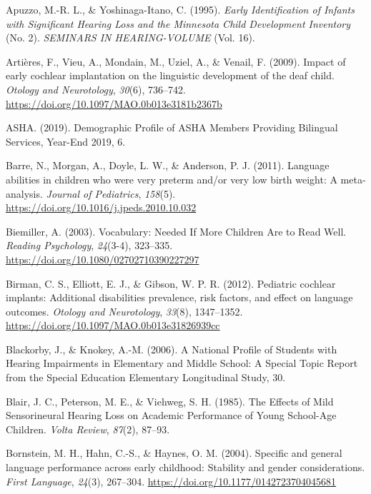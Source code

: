 \documentclass[
  english,
  man]{apa6}
\begin{document}
\leavevmode\hypertarget{ref-apuzzo1995}{}%
Apuzzo, M.-R. L., \& Yoshinaga-Itano, C. (1995). \emph{Early Identification of Infants with Significant Hearing Loss and the Minnesota Child Development Inventory} (No. 2). \emph{SEMINARS IN HEARING-VOLUME} (Vol. 16).

\leavevmode\hypertarget{ref-artieres2009}{}%
Artières, F., Vieu, A., Mondain, M., Uziel, A., \& Venail, F. (2009). Impact of early cochlear implantation on the linguistic development of the deaf child. \emph{Otology and Neurotology}, \emph{30}(6), 736--742. \url{https://doi.org/10.1097/MAO.0b013e3181b2367b}

\leavevmode\hypertarget{ref-asha2019}{}%
ASHA. (2019). Demographic Profile of ASHA Members Providing Bilingual Services, Year-End 2019, 6.

\leavevmode\hypertarget{ref-barre2011}{}%
Barre, N., Morgan, A., Doyle, L. W., \& Anderson, P. J. (2011). Language abilities in children who were very preterm and/or very low birth weight: A meta-analysis. \emph{Journal of Pediatrics}, \emph{158}(5). \url{https://doi.org/10.1016/j.jpeds.2010.10.032}

\leavevmode\hypertarget{ref-biemiller2003}{}%
Biemiller, A. (2003). Vocabulary: Needed If More Children Are to Read Well. \emph{Reading Psychology}, \emph{24}(3-4), 323--335. \url{https://doi.org/10.1080/02702710390227297}

\leavevmode\hypertarget{ref-birman2012}{}%
Birman, C. S., Elliott, E. J., \& Gibson, W. P. R. (2012). Pediatric cochlear implants: Additional disabilities prevalence, risk factors, and effect on language outcomes. \emph{Otology and Neurotology}, \emph{33}(8), 1347--1352. \url{https://doi.org/10.1097/MAO.0b013e31826939cc}

\leavevmode\hypertarget{ref-blackorby2006}{}%
Blackorby, J., \& Knokey, A.-M. (2006). A National Profile of Students with Hearing Impairments in Elementary and Middle School: A Special Topic Report from the Special Education Elementary Longitudinal Study, 30.

\leavevmode\hypertarget{ref-blair1985}{}%
Blair, J. C., Peterson, M. E., \& Viehweg, S. H. (1985). The Effects of Mild Sensorineural Hearing Loss on Academic Performance of Young School-Age Children. \emph{Volta Review}, \emph{87}(2), 87--93.

\leavevmode\hypertarget{ref-bornstein2004}{}%
Bornstein, M. H., Hahn, C.-S., \& Haynes, O. M. (2004). Specific and general language performance across early childhood: Stability and gender considerations. \emph{First Language}, \emph{24}(3), 267--304. \url{https://doi.org/10.1177/0142723704045681}
\end{document}

